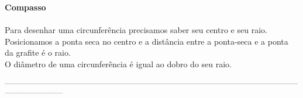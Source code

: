 \documentclass[a4paper,14pt]{article}
\begin{document}
\begin{multicols}{2}
\begin{center}
		\end{center}
		\noindent \textbf{Compasso} \\\\
		Para desenhar uma circunferência precisamos saber seu centro e seu raio. Posicionamos a ponta seca no centro e a distância entre a ponta-seca e a ponta da grafite é o raio. \\
		O diâmetro de uma circunferência é igual ao dobro do seu raio.
	\end{multicols}		
    	\noindent\textsubscript{-----------------------------------------------------------------------------------------------------------------------------------------------------------}
\end{document}
